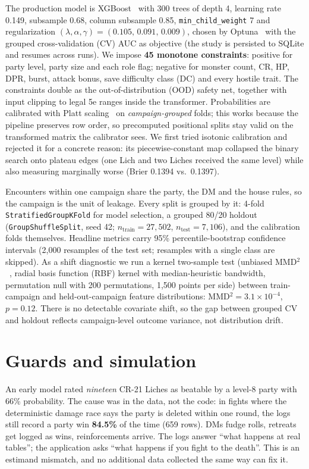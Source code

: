 \documentclass[10pt]{article}
\newcommand{\code}[1]{\texttt{\small #1}}
\begin{document}
The production model is XGBoost~\cite{xgboost} with 300 trees of depth 4, learning
rate 0.149, subsample 0.68, column subsample 0.85, \code{min\_child\_weight} 7 and
regularization $(\lambda,\alpha,\gamma)=(0.105,\,0.091,\,0.009)$, chosen by
Optuna~\cite{optuna} with the grouped cross-validation (CV) AUC as objective (the study is persisted
to SQLite and resumes across runs). We impose \textbf{45 monotone constraints}:
positive for party level, party size and each role flag; negative for monster
count, CR, HP, DPR, burst, attack bonus, save difficulty class (DC) and every hostile trait. The
constraints double as the out-of-distribution (OOD) safety net, together with input
clipping to legal 5e ranges inside the transformer. Probabilities are calibrated
with Platt scaling~\cite{platt} on \emph{campaign-grouped} folds; this works
because the pipeline preserves row order, so precomputed positional splits stay
valid on the transformed matrix the calibrator sees. We first tried isotonic
calibration and rejected it for a concrete reason: its piecewise-constant map
collapsed the binary search onto plateau edges (one Lich and two Liches received
the same level) while also measuring marginally worse (Brier 0.1394 vs.\ 0.1397).

Encounters within one campaign share the party, the DM and the house rules, so the
campaign is the unit of leakage. Every split is grouped by it: 4-fold
\code{StratifiedGroupKFold} for model selection, a grouped 80/20 holdout
(\code{GroupShuffleSplit}, seed 42; $n_\text{train}{=}27{,}502$,
$n_\text{test}{=}7{,}106$), and the calibration folds themselves. Headline metrics
carry 95\% percentile-bootstrap confidence intervals (2{,}000 resamples of the test
set; resamples with a single class are skipped). As a shift diagnostic we run a
kernel two-sample test (unbiased MMD$^2$~\cite{mmd}, radial basis function (RBF) kernel with
median-heuristic bandwidth, permutation null with 200 permutations, 1{,}500 points
per side) between train-campaign and held-out-campaign feature distributions:
MMD$^2{=}3.1\times10^{-4}$, $p{=}0.12$. There is no detectable covariate shift, so
the gap between grouped CV and holdout reflects campaign-level outcome variance,
not distribution drift.

\section{Guards and simulation}
An early model rated \emph{nineteen} CR-21 Liches as beatable by a level-8 party
with 66\% probability. The cause was in the data, not the code: in fights where the
deterministic damage race says the party is deleted within one round, the logs
still record a party win \textbf{84.5\%} of the time (659 rows). DMs fudge rolls,
retreats get logged as wins, reinforcements arrive. The logs answer ``what happens
at real tables''; the application asks ``what happens if you fight to the death''.
This is an estimand mismatch, and no additional data collected the same way can fix
it.
\end{document}

